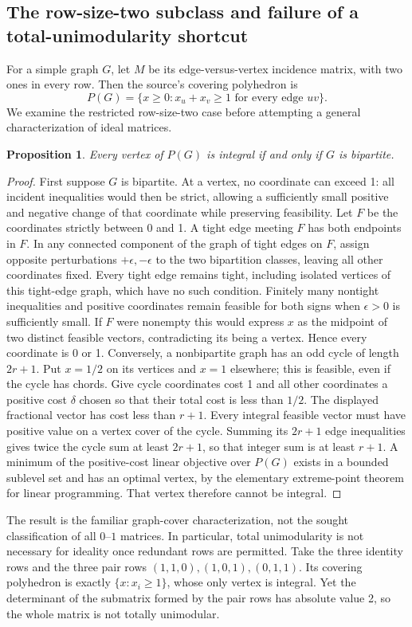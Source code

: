 \documentclass[11pt]{article}
\newtheorem{proposition}{Proposition}
\begin{document}
\subsection{The row-size-two subclass and failure of a total-unimodularity shortcut}
For a simple graph $G$, let $M$ be its edge-versus-vertex incidence matrix, with two ones in every row. Then the source's covering polyhedron is
\[
P(G)=\{x\ge0:x_u+x_v\ge1\text{ for every edge }uv\}.
\]
We examine the restricted row-size-two case before attempting a general characterization of ideal matrices.
\begin{proposition}
Every vertex of $P(G)$ is integral if and only if $G$ is bipartite.
\end{proposition}
\begin{proof}
First suppose $G$ is bipartite. At a vertex, no coordinate can exceed 1: all incident inequalities would then be strict, allowing a sufficiently small positive and negative change of that coordinate while preserving feasibility. Let $F$ be the coordinates strictly between 0 and 1. A tight edge meeting $F$ has both endpoints in $F$. In any connected component of the graph of tight edges on $F$, assign opposite perturbations $+\epsilon,-\epsilon$ to the two bipartition classes, leaving all other coordinates fixed. Every tight edge remains tight, including isolated vertices of this tight-edge graph, which have no such condition. Finitely many nontight inequalities and positive coordinates remain feasible for both signs when $\epsilon>0$ is sufficiently small. If $F$ were nonempty this would express $x$ as the midpoint of two distinct feasible vectors, contradicting its being a vertex. Hence every coordinate is 0 or 1.
Conversely, a nonbipartite graph has an odd cycle of length $2r+1$. Put $x=1/2$ on its vertices and $x=1$ elsewhere; this is feasible, even if the cycle has chords. Give cycle coordinates cost 1 and all other coordinates a positive cost $\delta$ chosen so that their total cost is less than $1/2$. The displayed fractional vector has cost less than $r+1$. Every integral feasible vector must have positive value on a vertex cover of the cycle. Summing its $2r+1$ edge inequalities gives twice the cycle sum at least $2r+1$, so that integer sum is at least $r+1$. A minimum of the positive-cost linear objective over $P(G)$ exists in a bounded sublevel set and has an optimal vertex, by the elementary extreme-point theorem for linear programming. That vertex therefore cannot be integral.
\end{proof}
The result is the familiar graph-cover characterization, not the sought classification of all $0$--$1$ matrices. In particular, total unimodularity is not necessary for ideality once redundant rows are permitted. Take the three identity rows and the three pair rows $(1,1,0),(1,0,1),(0,1,1)$. Its covering polyhedron is exactly $\{x:x_i\ge1\}$, whose only vertex is integral. Yet the determinant of the submatrix formed by the pair rows has absolute value 2, so the whole matrix is not totally unimodular.
\end{document}
